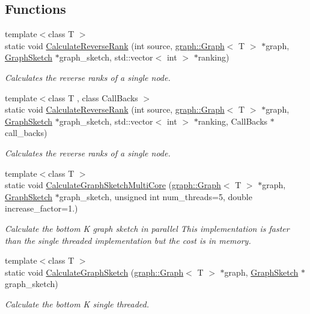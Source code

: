 \subsection*{Functions}
\begin{DoxyCompactItemize}
\item 
{\footnotesize template$<$class T $>$ }\\static void \hyperlink{namespaceall__distance__sketch_affbf72c369d687330a3f3d0ae32c9fed}{Calculate\+Reverse\+Rank} (int source, \hyperlink{classall__distance__sketch_1_1graph_1_1Graph}{graph\+::\+Graph}$<$ T $>$ $\ast$graph, \hyperlink{classall__distance__sketch_1_1GraphSketch}{Graph\+Sketch} $\ast$graph\+\_\+sketch, std\+::vector$<$ int $>$ $\ast$ranking)
\begin{DoxyCompactList}\small\item\em Calculates the reverse ranks of a single node. \end{DoxyCompactList}\item 
{\footnotesize template$<$class T , class Call\+Backs $>$ }\\static void \hyperlink{namespaceall__distance__sketch_a644b744de6f24ffc45a7d9dea1d95574}{Calculate\+Reverse\+Rank} (int source, \hyperlink{classall__distance__sketch_1_1graph_1_1Graph}{graph\+::\+Graph}$<$ T $>$ $\ast$graph, \hyperlink{classall__distance__sketch_1_1GraphSketch}{Graph\+Sketch} $\ast$graph\+\_\+sketch, std\+::vector$<$ int $>$ $\ast$ranking, Call\+Backs $\ast$call\+\_\+backs)
\begin{DoxyCompactList}\small\item\em Calculates the reverse ranks of a single node. \end{DoxyCompactList}\item 
{\footnotesize template$<$class T $>$ }\\static void \hyperlink{namespaceall__distance__sketch_a7fea917111c3851d7c909e896fbad571}{Calculate\+Graph\+Sketch\+Multi\+Core} (\hyperlink{classall__distance__sketch_1_1graph_1_1Graph}{graph\+::\+Graph}$<$ T $>$ $\ast$graph, \hyperlink{classall__distance__sketch_1_1GraphSketch}{Graph\+Sketch} $\ast$graph\+\_\+sketch, unsigned int num\+\_\+threads=5, double increase\+\_\+factor=1.)
\begin{DoxyCompactList}\small\item\em Calculate the bottom K graph sketch in parallel This implementation is faster than the single threaded implementation but the cost is in memory. \end{DoxyCompactList}\item 
{\footnotesize template$<$class T $>$ }\\static void \hyperlink{namespaceall__distance__sketch_a1e07f2d9df73bee36e926822ce0bb2ea}{Calculate\+Graph\+Sketch} (\hyperlink{classall__distance__sketch_1_1graph_1_1Graph}{graph\+::\+Graph}$<$ T $>$ $\ast$graph, \hyperlink{classall__distance__sketch_1_1GraphSketch}{Graph\+Sketch} $\ast$graph\+\_\+sketch)
\begin{DoxyCompactList}\small\item\em Calculate the bottom K single threaded. \end{DoxyCompactList}\end{DoxyCompactItemize}


